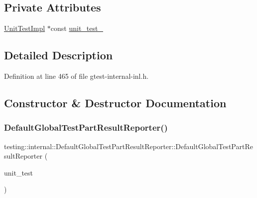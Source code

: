 \subsection*{Private Attributes}
\begin{DoxyCompactItemize}
\item 
\hyperlink{classtesting_1_1internal_1_1UnitTestImpl}{Unit\+Test\+Impl} $\ast$const \hyperlink{classtesting_1_1internal_1_1DefaultGlobalTestPartResultReporter_a9cf6282b104ca45d1abae6940708e0bb}{unit\+\_\+test\+\_\+}
\end{DoxyCompactItemize}


\subsection{Detailed Description}


Definition at line 465 of file gtest-\/internal-\/inl.\+h.



\subsection{Constructor \& Destructor Documentation}
\mbox{\label{classtesting_1_1internal_1_1DefaultGlobalTestPartResultReporter_a3900ea7f34b34afd48c7d1d0312a1488}} 
\subsubsection{\texorpdfstring{Default\+Global\+Test\+Part\+Result\+Reporter()}{DefaultGlobalTestPartResultReporter()}}
{\footnotesize\ttfamily testing\+::internal\+::\+Default\+Global\+Test\+Part\+Result\+Reporter\+::\+Default\+Global\+Test\+Part\+Result\+Reporter (\begin{DoxyParamCaption}\item[{\hyperlink{classtesting_1_1internal_1_1UnitTestImpl}{Unit\+Test\+Impl} $\ast$}]{unit\+\_\+test }\end{DoxyParamCaption})\hspace{0.3cm}{\ttfamily [explicit]}}



